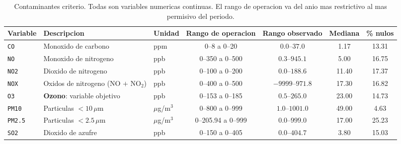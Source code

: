 
\begin{table}[t]
  \centering
  \caption{Contaminantes criterio. Todas son variables numericas continuas. El
    rango de operacion va del anio mas restrictivo al mas permisivo del
    periodo.}
  \label{tab:dic-contaminantes}
  \small
  \begin{tabular}{lllcccc}
    \toprule
    Variable & Descripcion & Unidad & Rango de operacion & Rango observado & Mediana & \% nulos \\
    \midrule
    \texttt{CO}    & Monoxido de carbono                   & ppm             & 0--8 a 0--20       & $0.0$--$37.0$    & 1.17  & 13.31 \\
    \texttt{NO}    & Monoxido de nitrogeno                 & ppb             & 0--350 a 0--500    & $0.3$--$945.1$   & 5.00  & 16.75 \\
    \texttt{NO2}   & Dioxido de nitrogeno                  & ppb             & 0--100 a 0--200    & $0.0$--$188.6$   & 11.40 & 17.37 \\
    \texttt{NOX}   & Oxidos de nitrogeno (NO $+$ NO$_2$)   & ppb             & 0--400 a 0--500    & $-9999$--$971.8$ & 17.30 & 16.82 \\
    \texttt{O3}    & \textbf{Ozono}: variable objetivo     & ppb             & 0--153 a 0--185    & $0.5$--$265.0$   & 23.00 & 14.73 \\
    \texttt{PM10}  & Particulas $<10\,\mu$m                & $\mu$g/m$^3$    & 0--800 a 0--999    & $1.0$--$1001.0$  & 49.00 & 4.63  \\
    \texttt{PM2.5} & Particulas $<2.5\,\mu$m               & $\mu$g/m$^3$    & 0--205.94 a 0--999 & $0.0$--$999.0$   & 17.00 & 25.23 \\
    \texttt{SO2}   & Dioxido de azufre                     & ppb             & 0--150 a 0--405    & $0.0$--$404.7$   & 3.80  & 15.03 \\
    \bottomrule
  \end{tabular}
\end{table}

